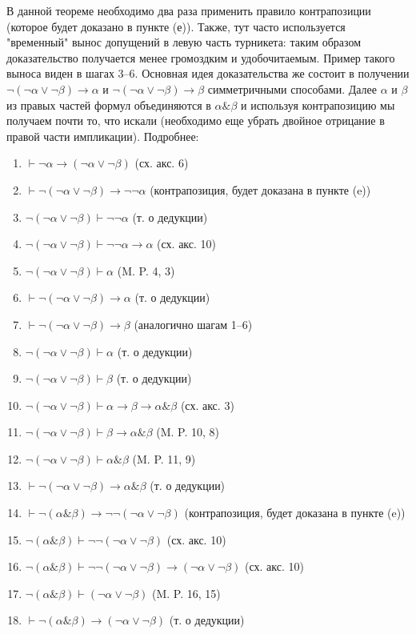 \documentclass[10pt,a4paper,oneside]{article}
\begin{document}
\begin{enumerate}[label=(\alph*)]
В данной теореме необходимо два раза применить правило контрапозиции (которое будет доказано в пункте (е)).
Также, тут часто используется "временный" вынос допущений в левую часть турникета: таким образом 
доказательство получается менее громоздким и удобочитаемым. Пример такого выноса виден в шагах 3--6.
Основная идея доказательства же состоит в получении $\neg(\neg\alpha \lor \neg\beta) \to \alpha$ и 
$\neg(\neg\alpha \lor \neg\beta) \to \beta$ симметричными способами. Далее $\alpha$ и $\beta$ из 
правых частей формул объединяются в $\alpha \& \beta$ и используя контрапозицию мы получаем почти то,
что искали (необходимо еще убрать двойное отрицание в правой части импликации). Подробнее:
\begin{enumerate}[label=(\arabic*)]
\item $\vdash \neg\alpha \to (\neg\alpha \lor \neg\beta)$ (сх. акс. 6)
\item $\vdash \neg(\neg\alpha \lor \neg\beta) \to \neg\neg\alpha$ (контрапозиция, будет доказана в пункте (e))
\item $\neg(\neg\alpha \lor \neg\beta) \vdash \neg\neg\alpha$ (т. о дедукции)
\item $\neg(\neg\alpha \lor \neg\beta) \vdash \neg\neg\alpha \to \alpha$ (сх. акс. 10)
\item $\neg(\neg\alpha \lor \neg\beta) \vdash \alpha$ (M. P. 4, 3)
\item $\vdash \neg(\neg\alpha \lor \neg\beta) \to \alpha$ (т. о дедукции)
\item $\vdash \neg(\neg\alpha \lor \neg\beta) \to \beta$ (аналогично шагам 1--6)
\item $\neg(\neg\alpha \lor \neg\beta) \vdash \alpha$ (т. о дедукции)
\item $\neg(\neg\alpha \lor \neg\beta) \vdash \beta$ (т. о дедукции)
\item $\neg(\neg\alpha \lor \neg\beta) \vdash \alpha \to \beta \to \alpha \& \beta$ (сх. акс. 3)
\item $\neg(\neg\alpha \lor \neg\beta) \vdash \beta \to \alpha \& \beta$ (M. P. 10, 8)
\item $\neg(\neg\alpha \lor \neg\beta) \vdash \alpha \& \beta$ (M. P. 11, 9)
\item $\vdash \neg(\neg\alpha \lor \neg\beta) \to \alpha \& \beta$ (т. о дедукции)
\item $\vdash \neg(\alpha \& \beta) \to \neg\neg(\neg\alpha \lor \neg\beta)$ (контрапозиция, будет доказана в пункте (e))
\item $\neg(\alpha \& \beta) \vdash \neg\neg(\neg\alpha \lor \neg\beta)$ (сх. акс. 10)
\item $\neg(\alpha \& \beta) \vdash \neg\neg(\neg\alpha \lor \neg\beta) \to (\neg\alpha \lor \neg\beta)$ (сх. акс. 10)
\item $\neg(\alpha \& \beta) \vdash (\neg\alpha \lor \neg\beta)$ (M. P. 16, 15)
\item $\vdash \neg(\alpha \& \beta) \to (\neg\alpha \lor \neg\beta)$ (т. о дедукции)
\end{enumerate}


\end{enumerate}
\end{document}
